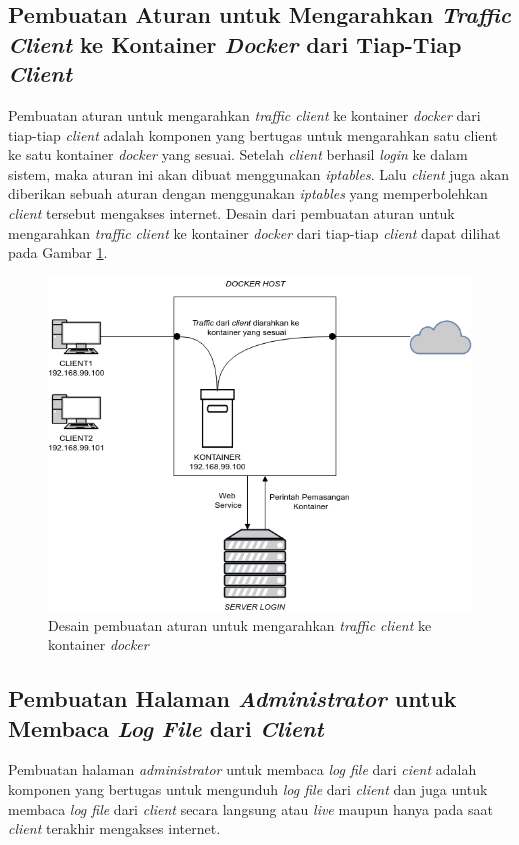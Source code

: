 \subsection{Pembuatan Aturan untuk Mengarahkan \textit{Traffic Client} ke Kontainer \textit{Docker} dari Tiap-Tiap \textit{Client}}
Pembuatan aturan untuk mengarahkan \textit{traffic client} ke kontainer \textit{docker} dari tiap-tiap \textit{client} adalah komponen yang bertugas untuk mengarahkan satu client ke satu kontainer \textit{docker} yang sesuai. Setelah \textit{client} berhasil \textit{login} ke dalam sistem, maka aturan ini akan dibuat menggunakan \textit{iptables}. Lalu \textit{client} juga akan diberikan sebuah aturan dengan menggunakan \textit{iptables} yang memperbolehkan \textit{client} tersebut mengakses internet. Desain dari pembuatan aturan untuk mengarahkan \textit{traffic client} ke kontainer \textit{docker} dari tiap-tiap \textit{client} dapat dilihat pada Gambar \ref{mengarahkankontainerdocker}.

\begin{figure}[H]
	\centering
	\includegraphics[width=\linewidth]{images/bab3/DIAGRAM3}
	\caption{Desain pembuatan aturan untuk mengarahkan \textit{traffic client} ke kontainer \textit{docker}}
	\label{mengarahkankontainerdocker}
\end{figure}

\subsection{Pembuatan Halaman \textit{Administrator} untuk Membaca \textit{Log File} dari \textit{Client}}
Pembuatan halaman \textit{administrator} untuk membaca \textit{log file} dari \textit{cient} adalah komponen yang bertugas untuk mengunduh \textit{log file} dari \textit{client} dan juga untuk membaca \textit{log file} dari \textit{client} secara langsung atau \textit{live} maupun hanya pada saat \textit{client} terakhir mengakses internet.

